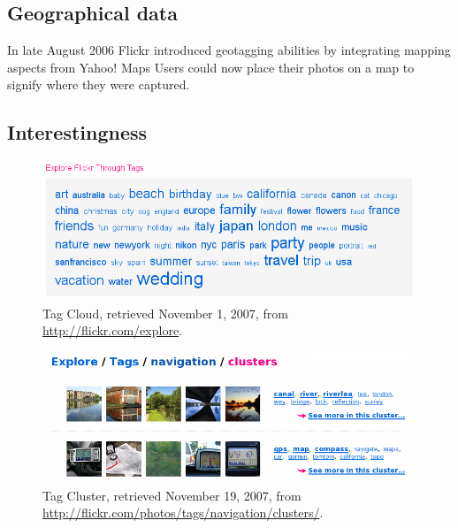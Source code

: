 \subsection{Geographical data}

In late August 2006 Flickr introduced geotagging abilities
\citep{butterfield06} by integrating mapping aspects from Yahoo! Maps%
Users could now place their photos on a
map to signify where they were captured.

\subsection{Interestingness}

\begin{figure}
  \begin{whole}
    \includegraphics[width=\wholewidth]{scrsh_flickr_tagcloud}
    \caption[Flickr Tag Cloud]{%
       Tag Cloud,
       retrieved November 1, 2007, from \url{http://flickr.com/explore}.}
    \label{figure:scrsh.flickr.tagcloud}
  \end{whole}
\end{figure}

\begin{figure}
  \begin{whole}
    \includegraphics[width=\wholewidth]{scrsh_flickr_tagcluster}
    \caption[Flickr Tag Cluster]{%
       Tag Cluster,
       retrieved November 19, 2007, from
       \url{http://flickr.com/photos/tags/navigation/clusters/}.}
    \label{figure:scrsh.flickr.tagcluster}
  \end{whole}
\end{figure}

